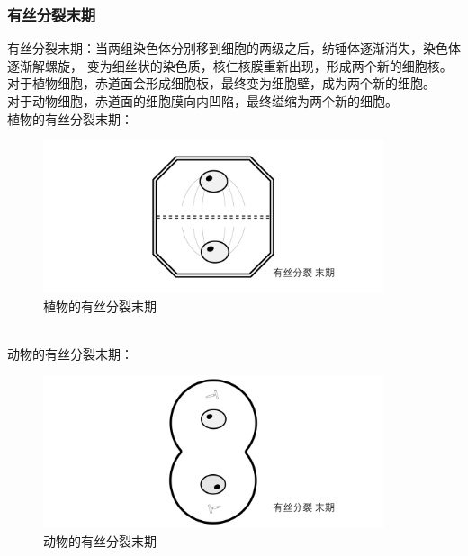 \documentclass[UTF8]{ctexart}
\begin{document}
\subsubsection{有丝分裂末期}
    有丝分裂末期：当两组染色体分别移到细胞的两级之后，纺锤体逐渐消失，染色体逐渐解螺旋，
    变为细丝状的染色质，核仁核膜重新出现，形成两个新的细胞核。\\[3mm]
    对于植物细胞，赤道面会形成细胞板，最终变为细胞壁，成为两个新的细胞。\\[3mm]
    对于动物细胞，赤道面的细胞膜向内凹陷，最终缢缩为两个新的细胞。\\[6mm]
    植物的有丝分裂末期：
    \begin{figure}[h]
        \begin{center}
            \includegraphics[width=10cm]{BiologyImage/28.jpg}
            \caption{植物的有丝分裂末期}
        \end{center}
    \end{figure}\\
    动物的有丝分裂末期：
    \begin{figure}[h]
        \begin{center}
            \includegraphics[width=10cm]{BiologyImage/33.jpg}
            \caption{动物的有丝分裂末期}
        \end{center}
    \end{figure}

\newpage
\end{document}
